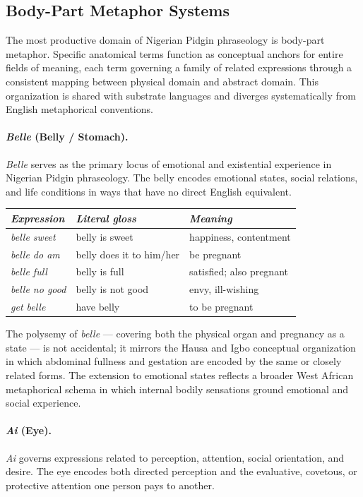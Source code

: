 \documentclass[12pt]{article}
\begin{document}
\subsection{Body-Part Metaphor Systems}

The most productive domain of Nigerian Pidgin phraseology is body-part metaphor. Specific anatomical terms function as conceptual anchors for entire fields of meaning, each term governing a family of related expressions through a consistent mapping between physical domain and abstract domain. This organization is shared with substrate languages and diverges systematically from English metaphorical conventions.

\paragraph{\textit{Belle} (Belly / Stomach).}
\textit{Belle} serves as the primary locus of emotional and existential experience in Nigerian Pidgin phraseology. The belly encodes emotional states, social relations, and life conditions in ways that have no direct English equivalent.

\begin{center}
\begin{tabular}{lll}
\textit{Expression} & \textit{Literal gloss} & \textit{Meaning} \\
\hline
\textit{belle sweet} & belly is sweet & happiness, contentment \\
\textit{belle do am} & belly does it to him/her & be pregnant \\
\textit{belle full} & belly is full & satisfied; also pregnant \\
\textit{belle no good} & belly is not good & envy, ill-wishing \\
\textit{get belle} & have belly & to be pregnant \\
\end{tabular}
\end{center}

The polysemy of \textit{belle} --- covering both the physical organ and pregnancy as a state --- is not accidental; it mirrors the Hausa and Igbo conceptual organization in which abdominal fullness and gestation are encoded by the same or closely related forms. The extension to emotional states reflects a broader West African metaphorical schema in which internal bodily sensations ground emotional and social experience.

\paragraph{\textit{Ai} (Eye).}
\textit{Ai} governs expressions related to perception, attention, social orientation, and desire. The eye encodes both directed perception and the evaluative, covetous, or protective attention one person pays to another.
\end{document}
